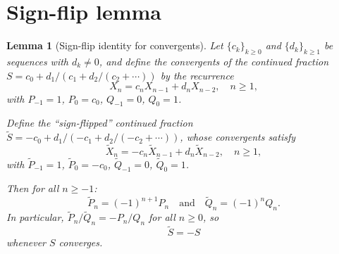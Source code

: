 \documentclass[11pt]{article}
\newtheorem{lemma}[theorem]{Lemma}
\begin{document}
\section{Sign-flip lemma}

\begin{lemma}[Sign-flip identity for convergents]\label{lem:signflip}
Let $\{c_k\}_{k \ge 0}$ and $\{d_k\}_{k \ge 1}$ be sequences
with $d_k \ne 0$, and define the convergents of the continued
fraction $S = c_0 + d_1/(c_1 + d_2/(c_2 + \cdots))$ by the
recurrence
\begin{equation}\label{eq:recurrence}
X_{n} = c_n X_{n-1} + d_n X_{n-2}, \quad n \ge 1,
\end{equation}
with $P_{-1} = 1$, $P_0 = c_0$, $Q_{-1} = 0$, $Q_0 = 1$.

Define the ``sign-flipped'' continued fraction
$\widetilde{S} = -c_0 + d_1/(-c_1 + d_2/(-c_2 + \cdots))$,
whose convergents satisfy
\begin{equation}\label{eq:recurrence2}
\widetilde{X}_{n} = -c_n \widetilde{X}_{n-1} + d_n \widetilde{X}_{n-2},
\quad n \ge 1,
\end{equation}
with $\widetilde{P}_{-1} = 1$, $\widetilde{P}_0 = -c_0$,
$\widetilde{Q}_{-1} = 0$, $\widetilde{Q}_0 = 1$.

Then for all $n \ge -1$:
\begin{equation}\label{eq:signrel}
\widetilde{P}_n = (-1)^{n+1} P_n
\quad\text{and}\quad
\widetilde{Q}_n = (-1)^n Q_n.
\end{equation}
In particular, $\widetilde{P}_n/\widetilde{Q}_n = -P_n/Q_n$
for all $n \ge 0$, so
\begin{equation}\label{eq:negconv}
\widetilde{S} = -S
\end{equation}
whenever $S$ converges.
\end{lemma}
\end{document}
